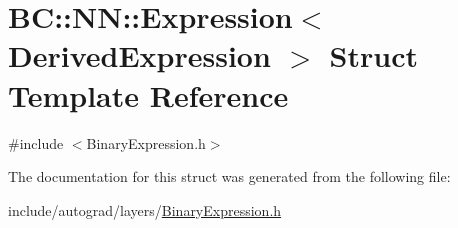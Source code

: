 \hypertarget{structBC_1_1NN_1_1Expression}{}\section{BC\+:\+:NN\+:\+:Expression$<$ Derived\+Expression $>$ Struct Template Reference}
\label{structBC_1_1NN_1_1Expression}


{\ttfamily \#include $<$Binary\+Expression.\+h$>$}



The documentation for this struct was generated from the following file\+:\begin{DoxyCompactItemize}
\item 
include/autograd/layers/\hyperlink{BinaryExpression_8h}{Binary\+Expression.\+h}\end{DoxyCompactItemize}
